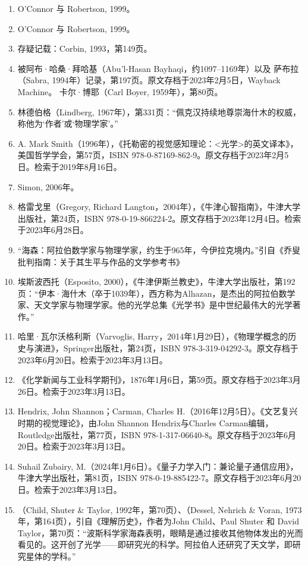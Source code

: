 \begin{enumerate}
\item O'Connor 与 Robertson, 1999。
\item O'Connor 与 Robertson, 1999。
\item 存疑记载：Corbin, 1993，第149页。
\item 被阿布·哈桑·拜哈基（Abu'l-Hasan Bayhaqi，约1097–1169年）以及
萨布拉（Sabra, 1994年）记录，第197页。原文存档于2023年2月5日，Wayback Machine。
卡尔·博耶（Carl Boyer, 1959年），第80页。
\item 林德伯格（Lindberg, 1967年），第331页：“佩克汉持续地尊崇海什木的权威，称他为‘作者’或‘物理学家’。”
\item A. Mark Smith（1996年），《托勒密的视觉感知理论：<光学>的英文译本》，美国哲学学会，第57页，ISBN 978-0-87169-862-9。原文存档于2023年2月5日。检索于2019年8月16日。
\item Simon, 2006年。
\item 格雷戈里（Gregory, Richard Langton，2004年），《牛津心智指南》，牛津大学出版社，第24页，ISBN 978-0-19-866224-2。原文存档于2023年12月4日。检索于2023年6月28日。
\item “海森：阿拉伯数学家与物理学家，约生于965年，今伊拉克境内。”引自《乔叟批判指南：关于其生平与作品的文学参考书》
\item 埃斯波西托（Esposito, 2000），《牛津伊斯兰教史》，牛津大学出版社，第192页：“伊本·海什木（卒于1039年），西方称为Alhazan，是杰出的阿拉伯数学家、天文学家与物理学家。他的光学总集《光学书》是中世纪最伟大的光学著作。”
\item 哈里·瓦尔沃格利斯（Varvoglis, Harry，2014年1月29日），《物理学概念的历史与演进》，Springer出版社，第24页，ISBN 978-3-319-04292-3。原文存档于2023年6月20日。检索于2023年3月13日。
\item 《化学新闻与工业科学期刊》，1876年1月6日，第59页。原文存档于2023年3月26日。检索于2023年3月13日。
\item Hendrix, John Shannon；Carman, Charles H.（2016年12月5日）。《文艺复兴时期的视觉理论》，由John Shannon Hendrix与Charles Carman编辑，Routledge出版社，第77页，ISBN 978-1-317-06640-8。原文存档于2023年6月20日。检索于2023年3月13日。
\item Suhail Zubairy, M.（2024年1月6日）。《量子力学入门：兼论量子通信应用》，牛津大学出版社，第81页，ISBN 978-0-19-885422-7。原文存档于2023年6月20日。检索于2023年3月13日。
\item （Child, Shuter & Taylor, 1992年，第70页）、（Dessel, Nehrich & Voran, 1973年，第164页），引自《理解历史》，作者为John Child、Paul Shuter 和 David Taylor，第70页：“波斯科学家海森表明，眼睛是通过接收其他物体发出的光而看见的。这开创了光学——即研究光的科学。阿拉伯人还研究了天文学，即研究星体的学科。”

\end{enumerate}
